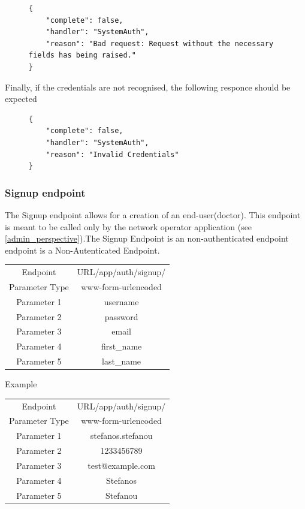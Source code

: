 					\begin{figure}[H]
						\iftrue
						\begin{lstlisting}[]
{
	"complete": false,
	"handler": "SystemAuth",
	"reason": "Bad request: Request without the necessary fields has being raised."
}
						\end{lstlisting}
					\end{figure}
					Finally, if the credentials are not recognised, the following responce should be expected
										\begin{figure}[H]
						\iftrue
						\begin{lstlisting}[]
{
	"complete": false,
	"handler": "SystemAuth",
	"reason": "Invalid Credentials"
}
						\end{lstlisting}
					\end{figure}
				\subsubsection{Signup endpoint}
					The Signup endpoint allows for a creation of an end-user(doctor). This endpoint is meant to be called only by the network operator application
					(see \ref{admin_perspective}).The Signup Endpoint is an non-authenticated endpoint
					endpoint is a Non-Autenticated Endpoint.\par
					\begin{center}
						\begin{tabular}{ |c|c| } 
							\hline
							Endpoint & {{URL}}/app/auth/signup/\\
							Parameter Type & www-form-urlencoded  \\
							Parameter 1 & username\\
							Parameter 2 & password  \\
							Parameter 3 & email  \\
							Parameter 4 & first\_name \\
							Parameter 5 & last\_name  \\
							\hline
						\end{tabular}
					\end{center}
					Example
					\begin{center}
						\begin{tabular}{ |c|c| } 
							\hline
							Endpoint & {{URL}}/app/auth/signup/\\
							Parameter Type & www-form-urlencoded  \\
							Parameter 1 & stefanos.stefanou\\
							Parameter 2 & 1233456789  \\
							Parameter 3 & test@example.com  \\
							Parameter 4 & Stefanos \\
							Parameter 5 & Stefanou  \\
							\hline
						\end{tabular}
					\end{center}
